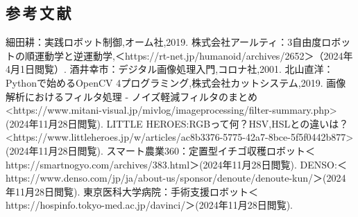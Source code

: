 \newpage
\begin{center}
  \section*{参\,考\,文\,献}                      %
\end{center}

\begin{thebibliography}{9}
   細田耕：実践ロボット制御,オーム社,2019.
   株式会社アールティ：3自由度ロボットの順運動学と逆運動学,＜https://rt-net.jp/humanoid/archives/2652＞（2024年4月1日閲覧）.
   酒井幸市：デジタル画像処理入門,コロナ社,2001.
   北山直洋：Pythonで始めるOpenCV 4プログラミング,株式会社カットシステム,2019.
   画像解析におけるフィルタ処理 - ノイズ軽減フィルタのまとめ\\
  <https://www.mitani-visual.jp/mivlog/imageprocessing/filter-summary.php> (2024年11月28日閲覧).
   LITTLE HEROES:RGBって何？HSV,HSLとの違いは？\\
  <https://www.littleheroes.jp/w/articles/ac8b3376-5775-42a7-8bce-5f5f0442b877>(2024年11月28日閲覧).
   スマート農業360：定置型イチゴ収穫ロボット＜https://smartnogyo.com/archives/383.html＞(2024年11月28日閲覧).
   DENSO:＜https://www.denso.com/jp/ja/about-us/sponsor/denoute/denoute-kun/＞(2024年11月28日閲覧).
   東京医科大学病院：手術支援ロボット＜https://hospinfo.tokyo-med.ac.jp/davinci/＞(2024年11月28日閲覧).
\end{thebibliography}


